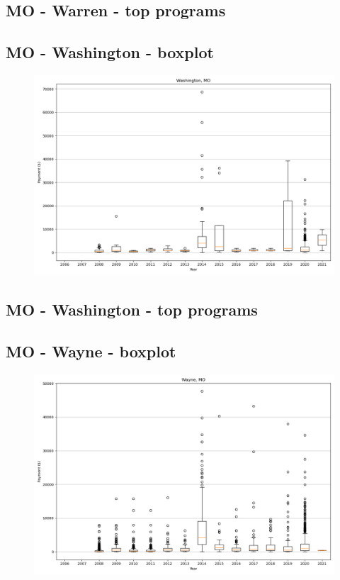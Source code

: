\subsection*{MO - Warren - top programs}

\newpage
\subsection*{MO - Washington - boxplot}
\begin{figure}[h]
\centering
\includegraphics[width=7in]{../output/boxplots/counties/Washington-MO_boxplot.png}
\end{figure}


\subsection*{MO - Washington - top programs}

\newpage
\subsection*{MO - Wayne - boxplot}
\begin{figure}[h]
\centering
\includegraphics[width=7in]{../output/boxplots/counties/Wayne-MO_boxplot.png}
\end{figure}


